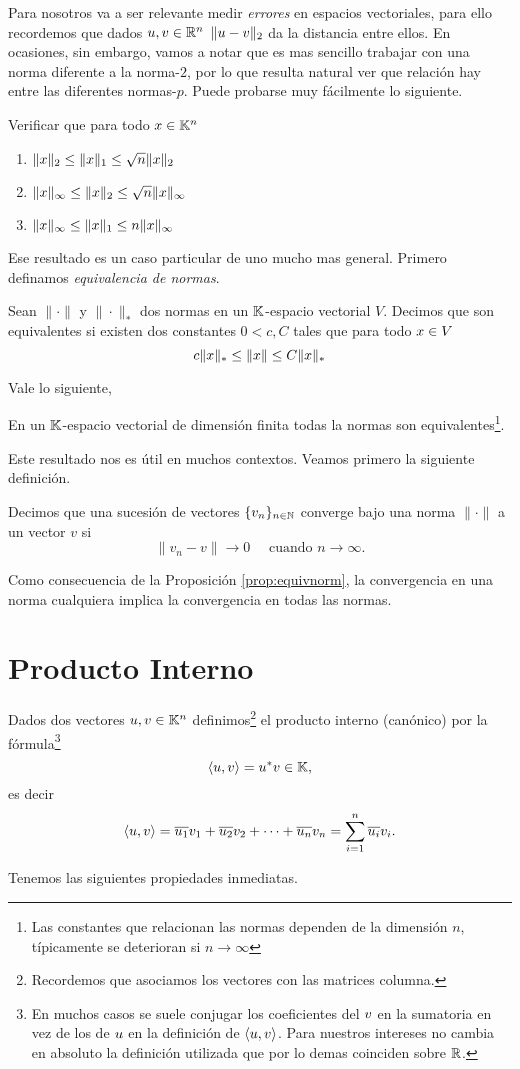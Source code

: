 Para nosotros va a ser relevante medir \emph{errores} en espacios vectoriales, para ello recordemos que dados $\ub,\vb\in \R^n$
$\|\ub-\vb\|_2$ da la distancia entre ellos. En ocasiones, sin embargo, vamos a notar que es mas sencillo trabajar con una norma diferente a la norma-$2$, por lo que resulta natural ver que relación hay entre las diferentes normas-$p$. Puede probarse muy fácilmente lo siguiente.
\begin{ej}
Verificar que para todo $\xb\in \K^n$
\begin{enumerate}
\item $\|\xb\|_2 \le \|\xb\|_1 \le \sqrt{n} \|\xb\|_2$
\item $\|\xb\|_\infty \le \|\xb\|_2 \le \sqrt{n} \|\xb\|_\infty$
\item $\|\xb\|_\infty \le \|\xb\|_1 \le n \|\xb\|_\infty$
\end{enumerate}
\end{ej}
Ese resultado es un caso particular de uno mucho mas general. Primero definamos \emph{equivalencia de normas}.
\tccdefi
\begin{defi}
 Sean $\|\cdot\|$ y $\|\cdot\|_{*}$ dos normas en un $\mathbb K$-espacio vectorial $V$. Decimos que son equivalentes si existen dos constantes $0<c,C$ tales que para todo $\xb\in V$
 $$
 c\|\xb\|_* \le \|\xb\| \le C \|\xb\|_*
 $$
\end{defi}
\etcc
Vale lo siguiente,
\begin{prop}
\label{prop:equivnorm}
 En un $\mathbb K$-espacio vectorial de dimensión finita todas la normas son equivalentes\footnote{Las constantes que relacionan las normas dependen de la dimensión $n$, típicamente se deterioran si $n\to \infty$}.
\end{prop}
Este resultado nos es útil en muchos contextos.  Veamos primero la siguiente definición.
\tccdefi
\begin{defi}
Decimos que una sucesi\'on de vectores $\{v_n\}_{n \in \mathbb N}$ converge bajo una norma $\|\cdot\|$ a un vector $v$ si
$$
\|v_n - v\| \rightarrow 0 \quad \text{ cuando } n \rightarrow \infty.
$$
\end{defi}
\etcc
Como consecuencia de la Proposición \ref{prop:equivnorm}, la convergencia en una norma cualquiera implica la convergencia en todas las normas.

\section{Producto Interno}
\tccdefi
\begin{defi}
Dados dos vectores $\ub, \vb \in \K^n$ definimos\footnote{Recordemos que asociamos los vectores con las matrices columna.} el producto interno (canónico) por la fórmula\footnote{En muchos casos se suele conjugar los coeficientes del $\vb$ en la sumatoria en vez de los de $\ub$  en la definición de $\langle \ub,\vb\rangle$. Para nuestros intereses no cambia en absoluto la definición utilizada que por lo demas coinciden sobre $\mathbb R$.} $$
\langle \ub, \vb \rangle = \ub^*\vb\in \K,
$$
es decir
$$
\langle \ub, \vb \rangle=\overline{u_1} v_1 + \overline{u_2} v_2 + \dots + \overline{u_n} v_n = \sum_{i=1}^{n} \overline{u_i}v_i.
$$
\end{defi}
\etcc
Tenemos las siguientes propiedades inmediatas.

